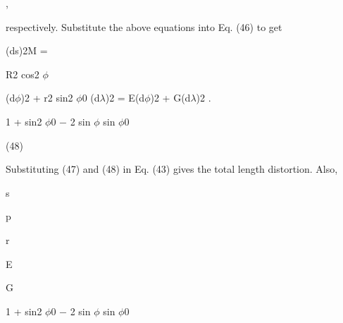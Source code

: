 \documentclass[a4paper,portrait,12pt]{article}
\begin{document}
,





\begin{flushleft}
respectively. Substitute the above equations into Eq. (46) to get
\end{flushleft}


\begin{flushleft}
(ds)2M =
\end{flushleft}





\begin{flushleft}
R2 cos2 $\phi$
\end{flushleft}


\begin{flushleft}
(d$\phi$)2 + r2 sin2 $\phi$0 (d$\lambda$)2 = E(d$\phi$)2 + G(d$\lambda$)2 .
\end{flushleft}


\begin{flushleft}
1 + sin2 $\phi$0 $-$ 2 sin $\phi$ sin $\phi$0
\end{flushleft}





(48)





\begin{flushleft}
Substituting (47) and (48) in Eq. (43) gives the total length distortion. Also,
\end{flushleft}


\begin{flushleft}
s
\end{flushleft}


\begin{flushleft}
p
\end{flushleft}


\begin{flushleft}
r
\end{flushleft}


\begin{flushleft}
E
\end{flushleft}


\begin{flushleft}
G
\end{flushleft}


\begin{flushleft}
1 + sin2 $\phi$0 $-$ 2 sin $\phi$ sin $\phi$0
\end{flushleft}
\end{document}
